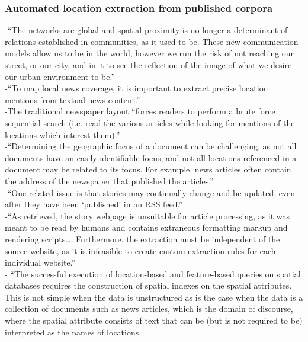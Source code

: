 \subsubsection{Automated location extraction from published corpora}
-{\color{orange}“The networks are global and spatial proximity is no longer a determinant of relations established in communities, as it used to be. These new communication models allow us to be in the world, however we run the risk of not reaching our street, or our city, and in it to see the reflection of the image of what we desire our urban environment to be.”} \cite{Painho2013}\\
-{\color{orange}“To map local news coverage, it is important to extract precise location mentions from textual news content.”\cite{Gupta2020}}\\
-{\color{orange}The traditional newspaper layout “forces readers to perform a brute force sequential search (i.e. read the various articles while looking for mentions of the locations which interest them).”\cite{Teitler2008}}\\
-{\color{orange}“Determining the geographic focus of a document can be challenging, as not all documents have an easily identifiable focus, and not all locations referenced in a document may be related to its focus. For example, news articles often contain the address of the newspaper that published the articles.”\cite{Teitler2008}}\\
-{\color{orange}“One related issue is that stories may continually change and be updated, even after they have been ‘published’ in an RSS feed.”\cite{Teitler2008}}\\
-{\color{orange}“As retrieved, the story webpage is unsuitable for article processing, as it was meant to be read by humans and contains extraneous formatting markup and rendering scripts…. Furthermore, the extraction must be independent of the source website, as it is infeasible to create custom extraction rules for each individual website.”\cite{Teitler2008}}\\
-{\color{orange} “The successful execution of location-based and feature-based queries on spatial databases requires the construction of spatial indexes on the spatial attributes. This is not simple when the data is unstructured as is the case when the data is a collection of documents such as news articles, which is the domain of discourse, where the spatial attribute consists of text that can be (but is not required to be) interpreted as the names of locations.
\cite{Lieberman2010}}\\

